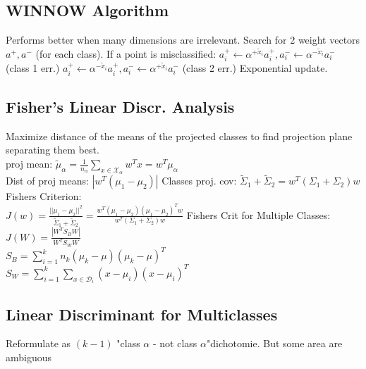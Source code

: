 \subsection*{WINNOW Algorithm}
Performs better when many dimensions are irrelevant. Search for 2 weight vectors $a^+, a^-$ (for each class). If a point is misclassified:
$a_i^+ {\leftarrow} \alpha^{+\tilde{x}_i}a_i^+, a_i^- {\leftarrow} \alpha^{-\tilde{x}_i}a_i^-$ (class 1 err.)
$a_i^+ {\leftarrow} \alpha^{-\tilde{x}_i}a_i^+, a_i^- {\leftarrow} \alpha^{+\tilde{x}_i}a_i^-$ (class 2 err.)
Exponential update.

\subsection*{Fisher's Linear Discr. Analysis}
Maximize distance of the means of the projected classes to find projection plane separating them best.\\
proj mean: $\tilde{\mu}_{\alpha}{=}\frac{1}{n_{\alpha}}\sum_{x\in\mathcal{X}_{\alpha}}w^Tx{=}w^T\mu_{\alpha}$\\
Dist of proj means: $|w^T(\mu_1-\mu_2)|$
Classes proj. cov: $\tilde{\Sigma}_1{+}\tilde{\Sigma}_2{=}w^T(\Sigma_1{+}\Sigma_2)w$\\
Fishers Criterion:\\
$J(w)=\frac{||\mu_1-\mu_2||^2}{\tilde{\Sigma}_1{+}\tilde{\Sigma}_2}=\frac{w^T(\mu_1-\mu_2)(\mu_1-\mu_2)^Tw}{w^T(\Sigma_1{+}\Sigma_2)w}$
Fishers Crit for Multiple Classes:\\
$J(W)=\frac{|W^TS_BW|}{W^TS_WW}$\\
$S_B=\sum_{i=1}^kn_k(\mu_k-\mu)(\mu_k-\mu)^T$\\
$S_W=\sum_{i=1}^k\sum_{x\in \mathcal{D}_i}(x-\mu_i)(x-\mu_i)^T$

\subsection*{Linear Discriminant for Multiclasses}
Reformulate as $(k-1)$ "class $\alpha$ - not class $\alpha$"dichotomie.
But some area are ambiguous
